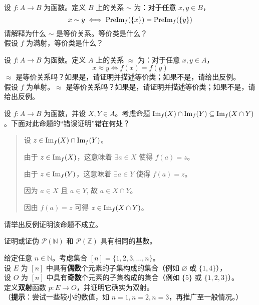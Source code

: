 \begin{exercise}
    设 $f : A \to B$ 为函数。定义 $B$ 上的关系 $\sim$ 为：对于任意 $x,y \in B$，
    \[x \sim y \iff \text{PreIm}_f (\{x\}) = \text{PreIm}_f (\{y\})\]
    请解释为什么 $\sim$ 是等价关系。等价类是什么？\\
    假设 $f$ 为满射，等价类是什么？
\end{exercise}

\begin{exercise}
    设 $f : A \to B$ 为函数。定义 $A$ 上的关系 $\approx$ 为：对于任意 $x,y \in A$，
    \[x \approx y \iff f(x) = f(y)\]
    $\approx$ 是等价关系吗？如果是，请证明并描述等价类；如果不是，请给出反例。\\
    假设 $f$ 为单射。$\approx$ 是等价关系吗？如果是，请证明并描述等价类；如果不是，请给出反例。
\end{exercise}

\begin{exercise}
    设 $f : A \to B$ 为函数，并设 $X,Y \in A$。考虑命题 $\text{Im}_f (X) \cap \text{Im}_f (Y) \subseteq \text{Im}_f (X \cap Y )$。下面对此命题的``错误证明''错在何处？
    \begin{quote}
        \begin{spoof}
            设 $z \in \text{Im}_f (X) \cap \text{Im}_f (Y)$。

            由于 $z \in \text{Im}_f (X)$，这意味着 $\exists a \in X$ 使得 $f(a) = z$。

            由于 $z \in \text{Im}_f (Y)$，这意味着 $\exists a \in Y$ 使得 $f(a) = z$。

            因为 $a \in X$ 且 $a \in Y$, 故 $a \in X \cap Y$。

            因由 $f(a) = z$ 可得 $z \in \text{Im}_f (X \cap Y)$。
        \end{spoof}
    \end{quote}
    请举出反例证明该命题不成立。
\end{exercise}

\begin{exercise}
    证明或证伪 $\mathcal{P}(\mathbb{N})$ 和 $\mathcal{P}(\mathbb{Z})$ 具有相同的基数。
\end{exercise}

\begin{exercise}
    给定任意 $n \in \mathbb{N}$。考虑集合 $[n] = \{1, 2, 3, \dots , n\}$。\\
    设 $E$ 为 $[n]$ 中具有\textbf{偶数}个元素的子集构成的集合（例如 $\varnothing$ 或 $\{1,4\}$），\\
    设 $O$ 为 $[n]$ 中具有\textbf{奇数}个元素的子集构成的集合（例如 $\{5\}$ 或 $\{1,2,3\}$）。\\
    定义\textbf{双射}函数 $p : E \to O$，并证明它确实为双射。\\
    （\textbf{提示}：尝试一些较小的数值，如 $n = 1, n = 2, n = 3$，再推广至一般情况。）
\end{exercise}

